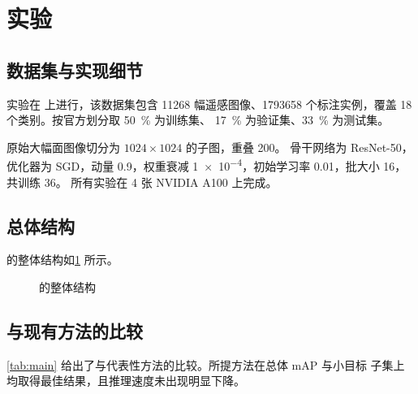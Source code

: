 \section{实验}
\label{sec:exp}

\subsection{数据集与实现细节}
\label{sec:exp:setup}

实验在 \dataset{} 上进行，该数据集包含 \num{11268} 幅遥感图像、\num{1793658}
个标注实例，覆盖 18 个类别。按官方划分取 \qty{50}{\percent} 为训练集、
\qty{17}{\percent} 为验证集、\qty{33}{\percent} 为测试集。

原始大幅面图像切分为 $1024 \times 1024$ 的子图，重叠 \qty{200}{\pixel}。
骨干网络为 ResNet-50，优化器为 SGD，动量 \num{0.9}，权重衰减
\num{1e-4}，初始学习率 \num{0.01}，批大小 16，共训练 \qty{36}{\epoch}。
所有实验在 4 张 NVIDIA A100 上完成。

\subsection{总体结构}
\label{sec:exp:arch}

\ourmethod{} 的整体结构如\cref{fig:architecture} 所示。

\begin{figure}[htbp]
  \centering
  \caption{\ourmethod{} 的整体结构}
  \label{fig:architecture}
\end{figure}

\subsection{与现有方法的比较}
\label{sec:exp:comparison}

\cref{tab:main} 给出了与代表性方法的比较。所提方法在总体 mAP 与小目标
子集上均取得最佳结果，且推理速度未出现明显下降。

